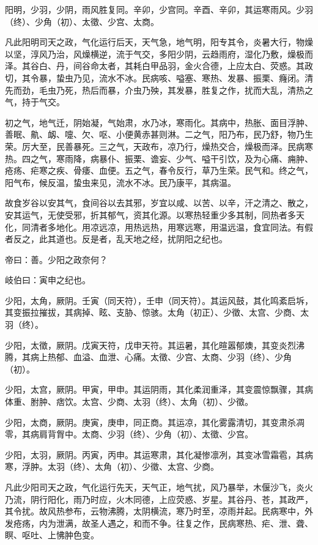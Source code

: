 \documentclass{article}%
\begin{document}
阳明，少羽，少阴，雨风胜复同。辛卯，少宫同。辛酉、辛卯，其运寒雨风。少羽（终）、少角（初）、太徵、少宫、太商。

凡此阳明司天之政，气化运行后天，天气急，地气明，阳专其令，炎暑大行，物燥以坚，淳风乃治，风燥横逆，流于气交，多阳少阴，云趋雨府，湿化乃敷，燥极而泽。其谷白、丹，间谷命太者，其耗白甲品羽，金火合德，上应太白、荧惑。其政切，其令暴，蛰虫乃见，流水不冰。民病咳、嗌塞、寒热、发暴、振栗、癃闭。清先而劲，毛虫乃死，热后而暴，介虫乃殃，其发暴，胜复之作，扰而大乱，清热之气，持于气交。

初之气，地气迁，阴始凝，气始肃，水乃冰，寒雨化。其病中，热胀、面目浮肿、善眠、鼽、衂、嚏、欠、呕、小便黄赤甚则淋。二之气，阳乃布，民乃舒，物乃生荣。厉大至，民善暴死。三之气，天政布，凉乃行，燥热交合，燥极而泽。民病寒热。四之气，寒雨降，病暴仆、振栗、谵妄、少气、嗌干引饮，及为心痛、痈肿、疮疡、疟寒之疾、骨痿、血便。五之气，春令反行，草乃生荣。民气和。终之气，阳气布，候反温，蛰虫来见，流水不冰。民乃康平，其病温。

故食岁谷以安其气，食间谷以去其邪，岁宜以咸、以苦、以辛，汗之清之、散之，安其运气，无使受邪，折其郁气，资其化源。以寒热轻重少多其制，同热者多天化，同清者多地化。用凉远凉，用热远热，用寒远寒，用温远温，食宜同法。有假者反之，此其道也。反是者，乱天地之经，扰阴阳之纪也。

帝曰：善。少阳之政奈何？

岐伯曰：寅申之纪也。

少阳，太角，厥阴。壬寅（同天符），壬申（同天符）。其运风鼓，其化鸣紊启坼，其变振拉摧拔，其病掉、眩、支胁、惊骇。太角（初正）、少徵、太宫、少商、太羽（终）。

少阳，太徵，厥阴。戊寅天符，戊申天符。其运暑，其化暄嚣郁燠，其变炎烈沸腾，其病上热郁、血溢、血泄、心痛。太徵、少宫、太商、少羽（终）、少角（初）。

少阳，太宫，厥阴。甲寅，甲申。其运阴雨，其化柔润重泽，其变震惊飘骤，其病体重、胕肿、痞饮。太宫、少商、太羽（终）、太角（初）、少徵。

少阳，太商，厥阴。庚寅，庚申，同正商。其运凉，其化雾露清切，其变肃杀凋零，其病肩背胷中。太商、少羽（终）、少角（初）、太徵、少宫。

少阳，太羽，厥阴。丙寅，丙申。其运寒肃，其化凝惨凛冽，其变冰雪霜雹，其病寒，浮肿。太羽（终）、太角（初）、少徵、太宫、少商。

凡此少阳司天之政，气化运行先天，天气正，地气扰，风乃暴举，木偃沙飞，炎火乃流，阴行阳化，雨乃时应，火木同德，上应荧惑、岁星。其谷丹、苍，其政严，其令扰。故风热参布，云物沸腾，太阴横流，寒乃时至，凉雨并起。民病寒中，外发疮疡，内为泄满，故圣人遇之，和而不争。往复之作，民病寒热、疟、泄、聋、瞑、呕吐、上怫肿色变。
\end{document}
